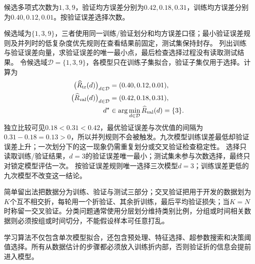 \label{struct:V1-C10-CH32}
\begin{example}[验证误差选择多项式次数]\label{exm:V1-C10-model-selection}
候选多项式次数为$1,3,9$，验证均方误差分别为$0.42,0.18,0.31$，训练均方误差分别为$0.40,0.12,0.01$。按验证误差选择次数。
\end{example}
\label{struct:V1-C10-CH33}
\begin{solution}
\SolGiven 候选域为$\{1,3,9\}$，三者使用同一训练/验证划分和均方误差口径；最小验证误差规则及并列时的低复杂度优先规则在查看结果前固定，测试集保持封存。
\SolPlan 列出训练与验证误差向量，求验证误差的唯一最小点，最后检查选择过程没有读取测试结果。
\SolDerive
令候选域$\mathcal D=\{1,3,9\}$，各模型只在训练子集拟合，验证子集仅用于选择。计算为
\[
\begin{aligned}
\bigl(\widehat R_{\rm tr}(d)\bigr)_{d\in\mathcal D}
  &=(0.40,0.12,0.01),\\
\bigl(\widehat R_{\rm val}(d)\bigr)_{d\in\mathcal D}
  &=(0.42,0.18,0.31),\\
d^\star
  &\in\arg\min_{d\in\mathcal D}\widehat R_{\rm val}(d)=\{3\}.
\end{aligned}
\]
独立比较可见$0.18<0.31<0.42$，最优验证误差与次优值的间隔为$0.31-0.18=0.13>0$，所以并列规则不会被触发。九次模型训练误差最低却验证误差上升；一次划分下的这一现象仍需重复划分或交叉验证检查稳定性。
\SolCheck 选择只读取训练/验证结果，$d=3$的验证误差唯一最小；测试集未参与次数选择，最终只对锁定模型评估一次。
\SolAnswer 按验证误差规则唯一选择三次模型$d=3$；训练误差更低的九次模型不改变这一结论。
\end{solution}


简单留出法把数据分为训练、验证与测试三部分；\kFold{}交叉验证把用于开发的数据划为$K$个互不相交折，每轮用一个折验证、其余折训练，最后平均验证损失；当$K=N$时称留一交叉验证。分类问题通常使用分层划分维持类别比例，分组或时间相关数据则必须按组或时间切分，不能假设样本可任意打乱。

\label{struct:V1-C10-CH10}
学习算法不仅包含单次模型拟合，还包含预处理、特征选择、超参数搜索和决策阈值选择。所有从数据估计的步骤都必须放入训练折内部，否则验证折的信息会提前进入模型。



